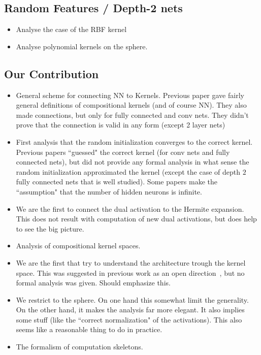 \subsection*{Random Features / Depth-2 nets}
\begin{itemize}
\item \cite{RahimiRe07, rahimi2009weighted} Analyse the case of the RBF kernel
\item \cite{pennington2015spherical} Analyse polynomial kernels on the sphere.
\end{itemize}

\subsection*{Our Contribution}
\begin{itemize}
\item General scheme for connecting NN to Kernels. Previous paper gave fairly general definitions of compositional kernels (and of course NN). They also made connections, but only for fully connected and conv nets. They didn't prove that the connection is valid in any form (except 2 layer nets)
\item First analysis that the random initialization converges to the correct kernel. Previous papers ``guessed" the correct kernel (for conv nets and fully connected nets), but did not provide any formal analysis in what sense the random initialization approximated the kernel (except the case of depth $2$ fully connected nets that is well studied). Some papers make the ``assumption" that the number of hidden neurons is infinite.
\item We are the first to connect the dual activation to the Hermite expansion. This does not result with computation of new dual activations, but does help to see the big picture.
\item Analysis of compositional kernel spaces.
\item We are the first that try to understand the architecture trough the kernel space. This was suggested in previous work as an open direction~\cite{mairal2014convolutional}, but no formal analysis was given. Should emphasize this.
\item We restrict to the sphere. On one hand this somewhat limit the generality. On the other hand, it makes the analysis far more elegant.
It also implies some stuff (like the ``correct normalization" of the activations).
This also seems like a reasonable thing to do in practice.
\item The formalism of computation skeletons.
\end{itemize}


